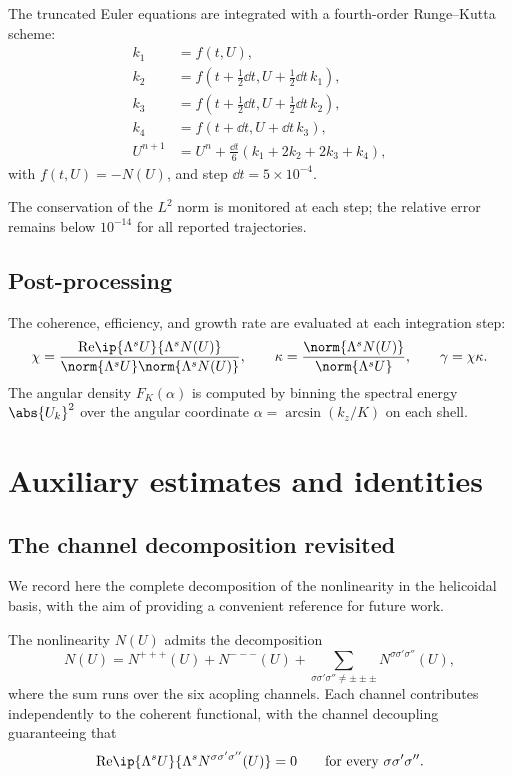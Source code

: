 The truncated Euler equations are integrated with a fourth-order 
Runge--Kutta scheme:
\begin{align}
k_1 &= f(t,U), \\
k_2 &= f(t+\tfrac12\dd t, U+\tfrac12\dd t\,k_1), \\
k_3 &= f(t+\tfrac12\dd t, U+\tfrac12\dd t\,k_2), \\
k_4 &= f(t+\dd t, U+\dd t\,k_3), \\
U^{n+1} &= U^n + \tfrac{\dd t}{6}(k_1+2k_2+2k_3+k_4),
\end{align}
with $f(t,U) = -N(U)$, and step $\dd t = 5\times 10^{-4}$.

The conservation of the $L^2$ norm is monitored at each step; the 
relative error remains below $10^{-14}$ for all reported 
trajectories.

\subsection{Post-processing}
\label{app:post-processing}

The coherence, efficiency, and growth rate are evaluated at each 
integration step:
\begin{equation}\label{eq:post-processing}
\chi = \frac{\mathrm{Re}\ip{\Lambda^s U}{\Lambda^s N(U)}}
            {\norm{\Lambda^s U}\norm{\Lambda^s N(U)}},
\qquad
\kappa = \frac{\norm{\Lambda^s N(U)}}{\norm{\Lambda^s U}},
\qquad
\gamma = \chi\kappa.
\end{equation}
The angular density $F_K(\alpha)$ is computed by binning the 
spectral energy $\abs{U_k}^2$ over the angular coordinate 
$\alpha = \arcsin(k_z/K)$ on each shell.

\section{Auxiliary estimates and identities}
\label{app:auxiliary}

\subsection{The channel decomposition revisited}
\label{app:channel-decomp}

We record here the complete decomposition of the nonlinearity in the 
helicoidal basis, with the aim of providing a convenient reference 
for future work.

\begin{proposition}\label{prop:full-channel}
The nonlinearity $N(U)$ admits the decomposition
\begin{equation}\label{eq:full-channel}
N(U) = N^{+++}(U) + N^{---}(U) + 
\sum_{\sigma\sigma'\sigma''\neq\pm\pm\pm}N^{\sigma\sigma'\sigma''}(U),
\end{equation}
where the sum runs over the six acopling channels. Each channel 
contributes independently to the coherent functional, with the 
channel decoupling guaranteeing that
\begin{equation}\label{eq:full-decoupling}
\mathrm{Re}\ip{\Lambda^s U}{\Lambda^s N^{\sigma\sigma'\sigma''}(U)} = 0
\qquad\text{for every }\sigma\sigma'\sigma''.
\end{equation}
\end{proposition}

